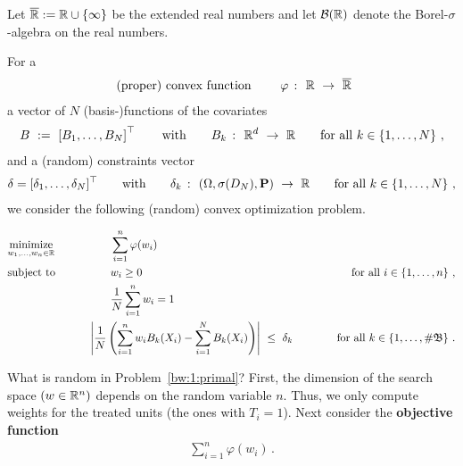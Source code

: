 Let
$\overline{\mathbb{R}}:=\mathbb{R}\cup \left\{ \infty \right\}$ 
be the extended real numbers
and let $\mathcal{B}(\mathbb{R})$ denote the Borel-$\sigma$-algebra on the real numbers.

For a 
\begin{align*}
  \text{
(proper) convex function
  }
  \qquad
  \varphi\ \colon\  \mathbb{R}\ \to\ \overline{\mathbb{R}}
\end{align*}
a vector of $N$ (basis-)functions of the covariates 
\begin{gather*}
  B
  \ 
  :=
  \ 
  \left[ 
    B_1,\ldots,B_N
  \right]^\top
  \qquad
  \text{with}\qquad 
  B_k\ \colon\  \R^d\ \to\ \R
  \qquad
  \text{for all}\ k\in \left\{ 1,\ldots,N \right\}
  \,,
\end{gather*}
and a (random) constraints vector
\begin{align*}
\delta=[\delta_1,\ldots,\delta_N]^\top
\qquad
  \text{with}\qquad 
  \delta_k\ \colon\  (\Omega,\sigma(D_N),\mathbf{P})\ \to\ \mathbb{R}
  \qquad
  \text{for all}\ k\in \left\{ 1,\ldots,N \right\}
  \,,
\end{align*}
we consider the following (random) convex optimization problem.
\newpage
\begin{fproblem}
  \label{bw:1:primal}
\begin{align*}
    &\underset{w_1, \ldots, w_n \in \R}
    {\text{minimize}}
    &&\qquad\qquad
    \sum_{i = 1}^{n} 
    \varphi(w_i)
    &&&
    \\
    &\text{subject to}
    &&\qquad\qquad
    w_i 
    \ge
    0
    &&&
    \qquad
    \text{for all}\ 
    i \in \left\{ 1, \ldots, n \right\}
    \,,
    \\
    & 
    &&\qquad\qquad
    \frac{1}{N}
    \sum_{i=1}^{n} 
    w_i
    =1
    \\
    & 
    &&\qquad
    \left| 
      \frac{1}{N} 
      \left( 
      \sum_{i = 1}^{n} 
      w_i
      B_k(X_i)
      -
      \sum_{i=1}^{N} 
      B_k(X_i)
      \right)
    \right|
    \ 
    \le 
    \ 
    \delta_k
    &&&
    \qquad
    \text{for all}\ 
    k \in \left\{ 1, \ldots, \# \mathfrak{B} \right\}
    \,.
\end{align*}
\end{fproblem}
What is random in Problem~\ref{bw:1:primal}?
First, the dimension of the search space $(w\in\mathbb{R}^n)$ depends on the random variable $n$. 
Thus, we only compute weights for the treated units (the ones with $T_i=1$).
Next consider the \textbf{objective function}
\begin{gather*}
    \sum_{i = 1}^{n} 
    \varphi(w_i)
    \,.
\end{gather*}
